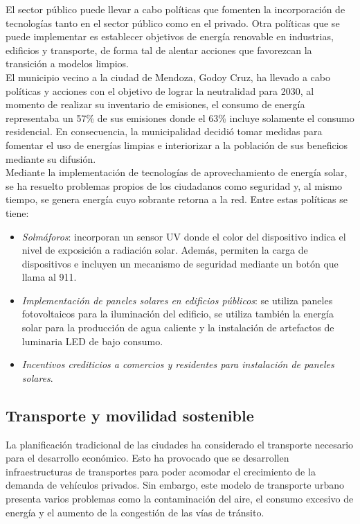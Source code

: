 \documentclass[runningheads]{llncs}
\begin{document}
El sector público puede llevar a cabo políticas que fomenten la incorporación de tecnologías tanto en el sector público como en el privado. Otra políticas que se puede implementar es establecer objetivos de energía renovable en industrias, edificios y transporte, de forma tal de alentar acciones que favorezcan la transición a modelos limpios.~\cite{ref_url6}\\

El municipio vecino a la ciudad de Mendoza, Godoy Cruz, ha llevado a cabo políticas y acciones con el objetivo de lograr la neutralidad para 2030, al momento de realizar su inventario de emisiones, el consumo de energía representaba un 57\% de sus emisiones donde el 63\% incluye solamente el consumo residencial. En consecuencia, la municipalidad decidió tomar medidas para fomentar el uso de energías limpias e interiorizar a la población de sus beneficios mediante su difusión.\\

Mediante la implementación de tecnologías de aprovechamiento de energía solar, se ha resuelto problemas propios de los ciudadanos como seguridad y, al mismo tiempo, se genera energía cuyo sobrante retorna a la red. Entre estas políticas se tiene:\\

\begin{itemize}
    \item \textit{Solmáforos}: incorporan un sensor UV donde el color del dispositivo indica el nivel de exposición a radiación solar. Además, permiten la carga de dispositivos e incluyen un mecanismo de seguridad mediante un botón que llama al 911. 
    \item \textit{Implementación de paneles solares en edificios públicos}: se utiliza paneles fotovoltaicos para la iluminación del edificio, se utiliza también la energía solar para la producción de agua caliente y la instalación de artefactos de luminaria LED de bajo consumo.
    \item \textit{Incentivos crediticios a comercios y residentes para instalación de paneles solares}.~\cite{ref_url4,ref_url5}
\end{itemize}

\subsection{Transporte y movilidad sostenible}
La planificación tradicional de las ciudades ha considerado el transporte necesario para el desarrollo económico. Esto ha provocado que se desarrollen infraestructuras de transportes para poder acomodar el crecimiento de la demanda de vehículos privados. Sin embargo, este modelo de transporte urbano presenta varios problemas como la contaminación del aire, el consumo excesivo de energía y el aumento de la congestión de las vías de tránsito.\\
\end{document}
